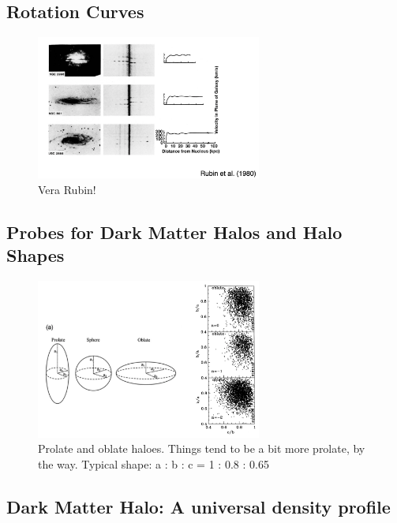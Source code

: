 \documentclass{article}
\begin{document}
\subsection{Rotation Curves}

\begin{figure}
    \centering
\includegraphics[width=0.66\textwidth]{figs/Screen Shot 2021-10-13 at 10.25.07 AM.png}
    \caption{Vera Rubin!}
    \label{fig:Vera}
\end{figure}

\subsection{Probes for Dark Matter Halos and Halo Shapes}

\begin{figure}
    \centering
\includegraphics[width=0.66\textwidth]{figs/Screen Shot 2021-10-13 at 10.27.20 AM.png}
    \caption{Prolate and oblate haloes. Things tend to be a bit more prolate, by the way. Typical shape: a : b : c = 1 : 0.8 : 0.65}
    \label{fig:DM_halo_shapes}
\end{figure}

\subsection{Dark Matter Halo: A universal density profile}
\end{document}
